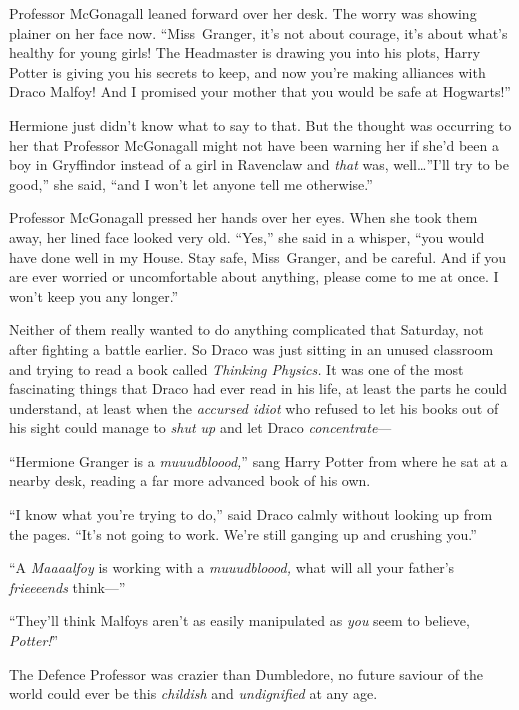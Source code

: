 Professor McGonagall leaned forward over her desk. The worry was showing plainer on her face now. “Miss~Granger, it’s not about courage, it’s about what’s healthy for young girls! The Headmaster is drawing you into his plots, Harry Potter is giving you his secrets to keep, and now you’re making alliances with Draco Malfoy! And I promised your mother that you would be safe at Hogwarts!”

Hermione just didn’t know what to say to that. But the thought was occurring to her that Professor McGonagall might not have been warning her if she’d been a boy in Gryffindor instead of a girl in Ravenclaw and \emph{that} was, well…”I’ll try to be good,” she said, “and I won’t let anyone tell me otherwise.”

Professor McGonagall pressed her hands over her eyes. When she took them away, her lined face looked very old. “Yes,” she said in a whisper, “you would have done well in my House. Stay safe, Miss~Granger, and be careful. And if you are ever worried or uncomfortable about anything, please come to me at once. I won’t keep you any longer.”


Neither of them really wanted to do anything complicated that Saturday, not after fighting a battle earlier. So Draco was just sitting in an unused classroom and trying to read a book called \emph{Thinking Physics.} It was one of the most fascinating things that Draco had ever read in his life, at least the parts he could understand, at least when the \emph{accursed idiot} who refused to let his books out of his sight could manage to \emph{shut up} and let Draco \emph{concentrate}—

“Hermione Granger is a \emph{muuudbloood,}” sang Harry Potter from where he sat at a nearby desk, reading a far more advanced book of his own.

“I know what you’re trying to do,” said Draco calmly without looking up from the pages. “It’s not going to work. We’re still ganging up and crushing you.”

“A \emph{Maaaalfoy} is working with a \emph{muuudbloood,} what will all your father’s \emph{frieeeends} think—”

“They’ll think Malfoys aren’t as easily manipulated as \emph{you} seem to believe, \emph{Potter!}”

The Defence Professor was crazier than Dumbledore, no future saviour of the world could ever be this \emph{childish} and \emph{undignified} at any age.

